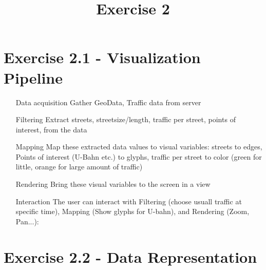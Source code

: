 \documentclass[a4paper]{article}
\date{}
\author{}
\title{Exercise 2}
\begin{document}
	
	\maketitle 
	\thispagestyle{fancy}
	
	\section*{Exercise 2.1 - Visualization Pipeline}
	\begin{itemize}
		\item[Data acquisition] Gather GeoData, Traffic data from server
		\item[Filtering] Extract streets, streetsize/length, traffic per street, points of interest, from the data 
		\item[Mapping] Map these extracted data values to visual variables: streets to edges, Points of interest (U-Bahn etc.) to glyphs, traffic per street to color (green for little, orange for large amount of traffic)
		\item[Rendering] Bring these visual variables to the screen in a view
		\item[Interaction] The user can interact with Filtering (choose usuall traffic at specific time), Mapping (Show glyphs for U-bahn), and Rendering (Zoom, Pan...): 
		
	\end{itemize}
	
	\section*{Exercise 2.2 - Data Representation}
	
	\newpage
\end{document}
